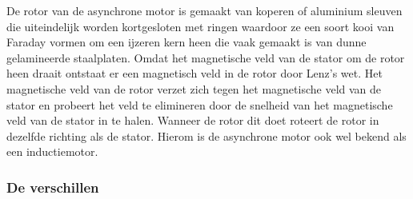 \vspace{0.5cm}

De rotor van de asynchrone motor is gemaakt van koperen of aluminium sleuven die uiteindelijk worden kortgesloten met ringen waardoor ze een soort kooi van Faraday vormen om een ijzeren kern heen die vaak gemaakt is van dunne gelamineerde staalplaten. Omdat het magnetische veld van de stator om de rotor heen draait ontstaat er een magnetisch veld in de rotor door Lenz’s wet. Het magnetische veld van de rotor verzet zich tegen het magnetische veld van de stator en probeert het veld te elimineren door de snelheid van het magnetische veld van de stator in te halen. Wanneer de rotor dit doet roteert de rotor in dezelfde richting als de stator. Hierom is de asynchrone motor ook wel bekend als een inductiemotor. \cite{web:DiffAsyncSync,web:SyncMotor,web:AsyncMotor}


\subsubsection{De verschillen}



